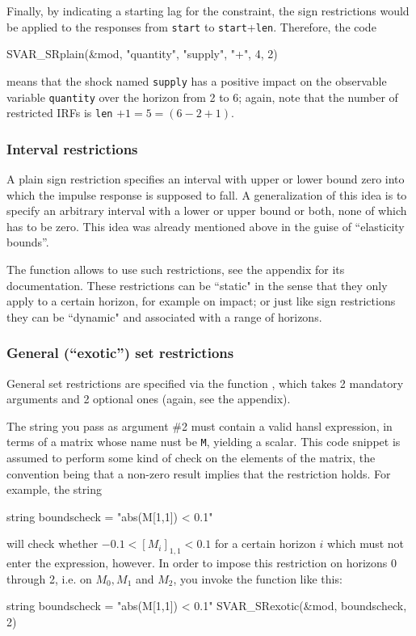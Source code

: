\documentclass[a4paper,10pt]{article}
\newcommand{\dtk}[1]{\texttt{\detokenize{#1}}}
\begin{document}
Finally, by indicating a starting lag for the constraint, the sign
restrictions would be applied to the responses from \texttt{start} to
\texttt{start}+\texttt{len}. Therefore, the code
\begin{code}
SVAR_SRplain(&mod, "quantity", "supply", "+", 4, 2)
\end{code}
means that the shock named \texttt{supply} has a positive impact on the
observable variable \texttt{quantity} over the horizon from 2 to 6;
again, note that the number of restricted IRFs is \texttt{len}
$+1 = 5 = (6-2+1)$.

\subsubsection{Interval restrictions}

A plain sign restriction specifies an interval with upper or lower bound zero 
into which the impulse response is supposed to fall. A generalization of this idea is to 
specify an arbitrary interval with a lower or upper bound or both, none of which has 
to be zero. This idea was already mentioned above in the guise of ``elasticity bounds''.

The \dtk{SVAR_SRfull} function allows to use such restrictions, see the appendix 
for its documentation. These restrictions can be ``static" in the sense that they only 
apply to a certain horizon, for example on impact; or just like sign restrictions they 
can be ``dynamic" and associated with a range of horizons. 


\subsubsection{General (``exotic'') set restrictions}

General set restrictions are specified via the function
\dtk{SVAR_SRexotic}, which takes 2 mandatory arguments and 2 optional ones
(again, see the appendix).

The string you pass as argument \#2 must contain a valid hansl
expression, in terms of a matrix whose name nust be \texttt{M},
yielding a scalar. This code snippet is assumed to perform some kind
of check on the elements of the matrix, the convention being that a
non-zero result implies that the restriction holds. For example, the
string
\begin{code}
string boundscheck = "abs(M[1,1]) < 0.1"
\end{code}
will check whether $-0.1 < [M_i]_{1,1} < 0.1$ for a certain horizon $i$
which must not enter the expression, however. In order to impose
this restriction on horizons 0 through 2, i.e. on $M_0, M_1$ and $M_2$,
you invoke the function like this:
\begin{code}
string boundscheck = "abs(M[1,1]) < 0.1"
SVAR_SRexotic(&mod, boundscheck, 2)
\end{code}
\end{document}
